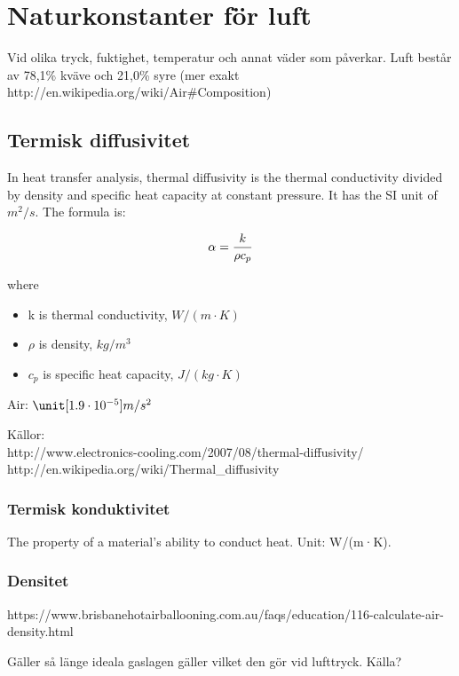 \section{Naturkonstanter för luft}

Vid olika tryck, fuktighet, temperatur och annat väder som påverkar. Luft består av 78,1\% kväve och 21,0\% syre (mer exakt http://en.wikipedia.org/wiki/Air\#Composition)

\subsection{Termisk diffusivitet} %
In heat transfer analysis, thermal diffusivity is the thermal conductivity divided by density and specific heat capacity at constant pressure. It has the SI unit of $m^2/s$. The formula is:

\begin{equation}
\alpha = {k \over {\rho c_p}}
\end{equation}

where
\begin{itemize}
   \item[] k is thermal conductivity, $\unit{W/(m·K)}$
   \item[] $\rho$ is density, $\unit{kg/m^3}$
   \item[] $c_p$ is specific heat capacity, $\unit{J/(kg·K)}$
\end{itemize}

Air: $\unit[1.9\cdot10^{-5}]{m/s^2}$

Källor:\\
http://www.electronics-cooling.com/2007/08/thermal-diffusivity/\\
http://en.wikipedia.org/wiki/Thermal\_diffusivity\\

\subsubsection{Termisk konduktivitet} %
The property of a material's ability to conduct heat. Unit: W/(m·K).

\subsubsection{Densitet} %

https://www.brisbanehotairballooning.com.au/faqs/education/116-calculate-air-density.html

Gäller så länge ideala gaslagen gäller vilket den gör vid lufttryck. Källa?


